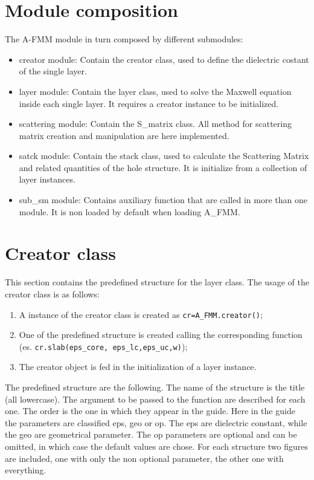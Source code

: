 \documentclass[a4paper,10pt]{report}
\begin{document}
\section{Module composition}
The A-FMM module in turn composed by different submodules:
\begin{itemize}
\item creator module: Contain the creator class, used to define the dielectric costant of the single layer.   
\item layer module: Contain the layer class, used to solve the Maxwell equation inside each single layer. It requires a creator instance to be initialized.
\item scattering module: Contain the S\_matrix class. All method for scattering matrix creation and manipulation are here implemented.  
\item satck module: Contain the stack class, used to calculate the Scattering Matrix and related quantities of the hole structure. It is initialize from a collection of layer instances.
\item sub\_sm module: Contains auxiliary function that are called in more than one module. It is non loaded by default when loading A\_FMM.
\end{itemize}

\section{Creator class}
This section contains the predefined structure for the layer class. The usage of the creator class is as follows:
\begin{enumerate}
\item A instance of the creator class is created as \texttt{cr=A\_FMM.creator()};
\item One of the predefined structure is created calling the corresponding function (es. \texttt{cr.slab(eps\_core, eps\_lc,eps\_uc,w)});
\item The creator object is fed in the initialization of a layer instance. 
\end{enumerate}

The predefined structure are the following. The name of the structure is the title (all lowercase). The argument to be passed to the function are described for each one. The order is the one in which they appear in the guide. Here in the guide the parameters are classified eps, geo or op. The eps are dielectric constant, while the geo are geometrical parameter. The op parameters are optional and can be omitted, in which case the default values are chose. For each structure two figures are included, one with only the non optional parameter, the other one with everything.
\end{document}
